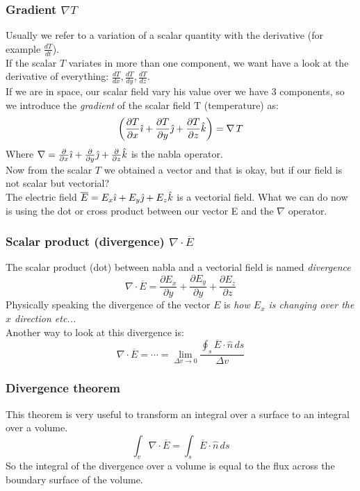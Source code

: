 \subsubsection*{Gradient $\nabla T$}
Usually we refer to a variation of a scalar quantity with the derivative (for example $\frac{dT}{dt}$).\\
If the scalar $T$ variates in more than one component, we want have a look at the derivative of everything: $\frac{dT}{dx},\frac{dT}{dy},\frac{dT}{dz}$.\\
If we are in space, our scalar field vary his value over we have 3 components, so we introduce the \emph{gradient} of the scalar field T (temperature) as:
\begin{equation}
\left(\frac{\partial T}{\partial x}\hat{\imath}+\frac{\partial T}{\partial y}\hat{\jmath}+\frac{\partial T}{\partial z}\hat{\mathnormal{k}}\right)=\nabla\,T
\end{equation}
Where $\nabla=\frac{\partial}{\partial x}\hat{\imath} +\frac{\partial}{\partial y}\hat{\jmath} +\frac{\partial}{\partial z}\hat{\mathnormal{k}}$ is the nabla operator.\\
Now from the scalar $T$ we obtained a vector and that is okay, but if our field is not scalar but vectorial?\\
The electric field $\overline{E}=E_x \hat{\imath} + E_y \hat{\jmath} + E_z \hat{\mathnormal{k}}$ is a vectorial field.
What we can do now is using the dot or cross product between our vector E and the $\nabla$ operator.
\subsubsection*{Scalar product (divergence) $\nabla \cdot \overline{E}$}
The scalar product (dot) between nabla and a vectorial field is named \emph{divergence}
\begin{equation}
\nabla \cdot \overline{E} =\frac{\partial E_x}{\partial y}+\frac{\partial E_y}{\partial y}+\frac{\partial E_z}{\partial z}
\end{equation}
Physically speaking the divergence of the vector $E$ is \textit{how $E_x$ is changing over the $x$ direction etc...}\\
Another way to look at this divergence is:
\begin{equation}
\nabla \cdot \overline{E} = \cdots = \lim_{\Delta v \rightarrow 0}\frac{\oint_s \overline{E}\cdot \hat{n}\, ds}{\Delta v}
\end{equation}
\subsubsection*{Divergence theorem}
This theorem is very useful to transform an integral over a surface to an integral over a volume.
\begin{equation}
\int_v \nabla \cdot \overline{E} = \int_s \overline{E}\cdot \hat{n}\,ds
\end{equation}
So the integral of the divergence over a volume is equal to the flux across the boundary surface of the volume.
